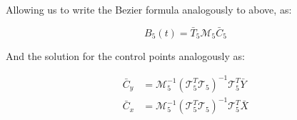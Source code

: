 \documentclass{article}
\begin{document}
Allowing us to write the Bezier formula analogously to above, as:

\[B_5(t)=\bar{T}_5\mathcal{M}_5\bar{C}_5\]

And the solution for the control points analogously as:

\begin{align*}
  \bar{C}_y &= \mathcal{M}_5^{-1}(\mathcal{T}_5^T\mathcal{T}_5)^{-1}\mathcal{T}_5^T\bar{Y} \\
  \bar{C}_x &= \mathcal{M}_5^{-1}(\mathcal{T}_5^T\mathcal{T}_5)^{-1}\mathcal{T}_5^T\bar{X}
\end{align*}
\end{document}
